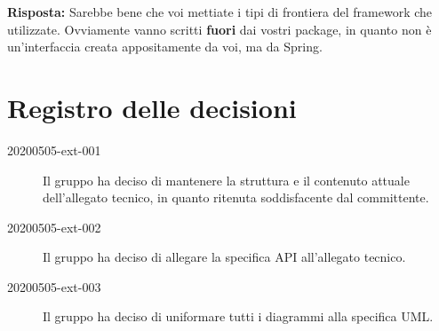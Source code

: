 \documentclass{article}
\begin{document}
\textbf{Risposta:} Sarebbe bene che voi mettiate i tipi di frontiera del framework che utilizzate. Ovviamente vanno scritti \textbf{fuori} dai vostri package, in quanto non è un'interfaccia creata appositamente da voi, ma da Spring.

\newpage
\section{Registro delle decisioni}%
\label{sec:registro_delle_decisioni}

\begin{description}
  \item[20200505-ext-001] Il gruppo ha deciso di mantenere la struttura e il contenuto attuale dell'allegato tecnico, in quanto ritenuta soddisfacente dal committente.
  \item[20200505-ext-002] Il gruppo ha deciso di allegare la specifica API all'allegato tecnico.
  \item[20200505-ext-003] Il gruppo ha deciso di uniformare tutti i diagrammi alla specifica UML\@.
\end{description}

\end{document}
